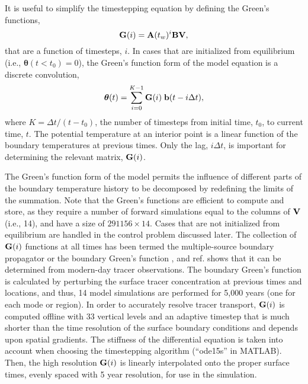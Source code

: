 \documentclass[12pt]{article}
\begin{document}
It is useful to simplify the timestepping equation by defining the Green's functions,
\begin{equation}
{\bf G}(i) = {\bf A}(t_w)^i {\bf B} {\bf V},
\end{equation}
that are a function of timesteps, $i$. 
In cases that are initialized from equilibrium (i.e., ${\boldsymbol \theta}(t<t_0)=0$), the Green's function form of the model equation is a discrete convolution,
\begin{equation}
\label{eq:equilibriumgreens}
{\boldsymbol \theta}(t) = \sum^{K-1}_{i=0}  {\bf G}(i) \; {\bf b} (t - i \Delta t),
\end{equation}
where $K={\Delta}t/(t-t_0)$, the number of timesteps from initial time, $t_0$, to current time, $t$.
The potential temperature at an interior point is a linear function of the boundary temperatures at previous times. Only the lag,
$i\Delta t$, is important for determining the relevant matrix, ${\bf G}(i)$.

The Green's function form of the model permits the influence of different parts of the boundary temperature history to be decomposed by redefining the limits of the summation. Note that the Green's functions are efficient to compute and store, as they require a number of forward simulations equal to the columns of ${\bf V}$ (i.e., 14), and have a size of $291156 \times 14$. Cases that are not initialized from equilibrium are handled in the control problem discussed later.
The collection of ${\bf G}(i)$ functions at all times has been termed
the multiple-source boundary propagator
\cite{Haine-Hall-2002:generalized} or the boundary Green's function
\cite{Wunsch--2002:Oceanic}, and ref. \cite{Gebbie-Huybers-2012:mean}
shows that it can be determined from modern-day tracer
observations. The boundary Green's function is calculated by
perturbing the surface tracer concentration at previous times and
locations, and thus, 14 model simulations are performed for 5,000 years (one for each mode or region). In order to accurately resolve tracer transport, ${\bf G}(i)$ is computed offline with 33 vertical levels and an adaptive timestep that is much shorter than the time resolution of the surface boundary conditions and depends upon spatial gradients. The stiffness of the differential equation is taken into account when choosing the timestepping algorithm (``ode15s'' in MATLAB). Then, the high resolution ${\bf G}(i)$ is linearly interpolated onto the proper surface times, evenly spaced with 5 year resolution, for
use in the simulation. 
\end{document}
